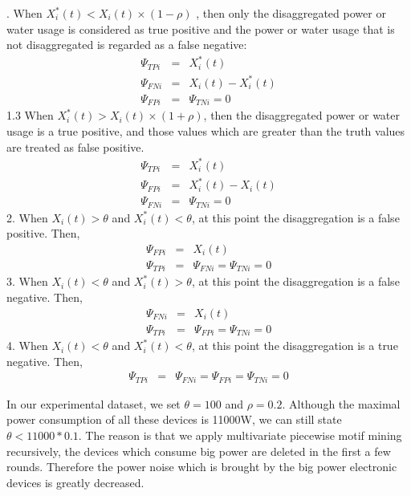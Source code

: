 . When $ X_i^*(t) < X_i(t) \times (1-\rho)$ , then only
the disaggregated power or water usage is considered as true positive and
the power or water usage that is not disaggregated is regarded as a false negative:
\begin{eqnarray*}
\Psi_{TPi}&=&X_i^*(t) \\
\Psi_{FNi}&=&X_i(t) - X_i^*(t) \\
\Psi_{FPi}&=&\Psi_{TNi}=0
\end{eqnarray*}
1.3 When $ X_i^*(t)>  X_i(t) \times (1+\rho) $, then
the disaggregated power or water usage is a true positive, and those values
which are greater than the truth values are treated as false positive.
\begin{eqnarray*}
\Psi_{TPi}&=&X_i^*(t) \\
\Psi_{FPi}&=&X_i^*(t) - X_i(t) \\
\Psi_{FNi}&=&\Psi_{TNi}=0
\end{eqnarray*}
2. When $X_i(t) > \theta$ and  $X_i^*(t)< \theta  $,
at this point the disaggregation is a false positive.  Then,
\begin{eqnarray*}
\Psi_{FPi}&=&X_i(t) \\
\Psi_{TPi}&=&\Psi_{FNi} =\Psi_{TNi}=0
\end{eqnarray*}
3. When $X_i(t) < \theta$ and  $X_i^*(t) > \theta  $,
at this point the disaggregation is a false negative. Then,
\begin{eqnarray*}
\Psi_{FNi}&=&X_i(t) \\
\Psi_{TPi}&=&\Psi_{FPi} =\Psi_{TNi}=0
\end{eqnarray*}
4. When $X_i(t) < \theta$ and  $X_i^*(t) < \theta  $,
at this point the disaggregation is a true negative.  Then,
\begin{eqnarray*}
\Psi_{TPi}&=&\Psi_{FNi} =\Psi_{FPi} =\Psi_{TNi}=0
\end{eqnarray*}

In our experimental dataset, we set
$\theta=100$ and $\rho=0.2$. 
Although the maximal power consumption of all these devices is 11000W, 
we can still state $\theta < 11000 * 0.1$. 
The reason is that we apply multivariate piecewise motif mining recursively, 
the devices which consume big power are deleted in the first a few rounds. 
Therefore the power noise which is brought by the big power electronic devices 
is greatly decreased. 
